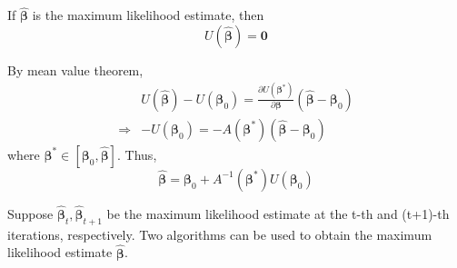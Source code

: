If $\hat{\boldsymbol{\beta}}$ is the maximum likelihood estimate, then
\begin{equation*}
    U\left(\hat{\boldsymbol{\beta}}\right)=\mathbf{0}
\end{equation*}

By mean value theorem,
\begin{equation*}
    \begin{aligned}
                    & U\left(\hat{\boldsymbol{\beta}}\right)-U\left(\boldsymbol{\beta}_{0}\right)=\frac{\partial U\left(\boldsymbol{\beta}^{*}\right)}{\partial\boldsymbol{\beta}}\left(\hat{\boldsymbol{\beta}}-\boldsymbol{\beta}_{0}\right) \\
        \Rightarrow & -U\left(\boldsymbol{\beta}_{0}\right)=-A\left(\boldsymbol{\beta}^{*}\right)\left(\hat{\boldsymbol{\beta}}-\boldsymbol{\beta}_{0}\right)
    \end{aligned}
\end{equation*}
where $\boldsymbol{\beta}^{*}\in\left[\boldsymbol{\beta}_{0},\hat{\boldsymbol{\beta}}\right]$. Thus,
\begin{equation*}
    \hat{\boldsymbol{\beta}}=\boldsymbol{\beta}_{0}+A^{-1}\left(\boldsymbol{\beta}^{*}\right)U\left(\boldsymbol{\beta}_{0}\right)
\end{equation*}

Suppose $\hat{\boldsymbol{\beta}}_{t},\hat{\boldsymbol{\beta}}_{t+1}$ be the maximum likelihood estimate at the t-th and (t+1)-th iterations, respectively. Two algorithms can be used to obtain the maximum likelihood estimate $\hat{\boldsymbol{\beta}}$.

